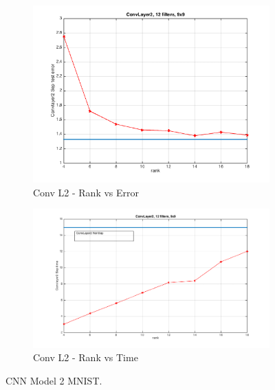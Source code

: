 \begin{figure}[h!]
  \centering
  \begin{subfigure}[b]{0.40\textwidth}
   \includegraphics[width=\textwidth]{presentation_plots/convL2_error.png}
    \caption{Conv L2 - Rank vs Error}
  \end{subfigure}
  \begin{subfigure}[b]{0.40\textwidth}
    \includegraphics[width=\textwidth]{presentation_plots/convL2_time.png}
    \caption{Conv L2 - Rank vs Time}
  \end{subfigure}
  \caption{CNN Model 2 MNIST.}
  \label{fig:cnn2error}
\end{figure}
